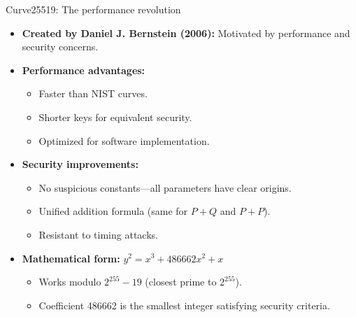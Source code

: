 \documentclass[aspectratio=169, lualatex, handout]{beamer}
\begin{document}
\begin{frame}{Curve25519: The performance revolution}
	\begin{itemize}[<+->]
		\item \textbf{Created by Daniel J. Bernstein (2006):} Motivated by performance and security concerns.
		\item \textbf{Performance advantages:}
		      \begin{itemize}
			      \item Faster than NIST curves.
			      \item Shorter keys for equivalent security.
			      \item Optimized for software implementation.
		      \end{itemize}
		\item \textbf{Security improvements:}
		      \begin{itemize}
			      \item No suspicious constants—all parameters have clear origins.
			      \item Unified addition formula (same for $P + Q$ and $P + P$).
			      \item Resistant to timing attacks.
		      \end{itemize}
		\item \textbf{Mathematical form:} $y^2 = x^3 + 486662x^2 + x$
		      \begin{itemize}
			      \item Works modulo $2^{255} - 19$ (closest prime to $2^{255}$).
			      \item Coefficient 486662 is the smallest integer satisfying security criteria.
		      \end{itemize}
	\end{itemize}
\end{frame}
\end{document}
